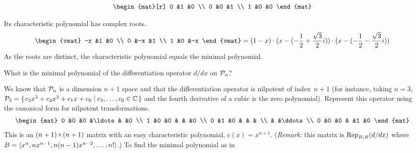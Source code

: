 \begin{exercises}
\begin{equation*}
\begin{mat}[r]
           0  &1  &0  \\
           0  &0  &1  \\
           1  &0  &0
        \end{mat}
     \end{equation*}
     \begin{answer}
       Its characteristic polynomial has complex roots.
       \begin{equation*}
          \begin{vmat}
                   -x  &1  &0  \\
                    0  &-x &1  \\
                    1  &0  &-x
          \end{vmat}
          =(1-x)\cdot (x-(-\frac{1}{2}+\frac{\sqrt{3}}{2}i))
                \cdot (x-(-\frac{1}{2}-\frac{\sqrt{3}}{2}i))
       \end{equation*}
       As the roots are distinct, the characteristic polynomial equals the
       minimal polynomial. 
     \end{answer}
  \recommended \item 
     What is the minimal polynomial of the differentiation
     operator $d/dx$ on \( \polyspace_n \)?
     \begin{answer}
       We know that $\polyspace_n$ is a dimension $n+1$ space and that
       the differentiation operator is
       nilpotent of index~$n+1$ (for instance, taking $n=3$, 
       $\polyspace_3=\set{c_3x^3+c_2x^2+c_1x+c_0\suchthat c_3,\ldots,c_0\in\C}$
       and the fourth derivative of a cubic is the zero polynomial).  
       Represent this operator using the canonical 
       form for nilpotent transformations.
       \begin{equation*}
         \begin{mat}
           0  &0  &0  &\ldots &  &0  \\
           1  &0  &0  &       &  &0  \\
           0  &1  &0  &       &  &   \\
              &   &\ddots            \\
           0  &0  &0  &       &1 &0 
         \end{mat}
       \end{equation*}
       This is an $\nbyn{(n+1)}$ matrix with an easy 
       characteristic polynomial,
       $c(x)=x^{n+1}$.
       (\textit{Remark:} this matrix is $\rep{d/dx}{B,B}$ where
        $B=\sequence{x^n,nx^{n-1},n(n-1)x^{n-2},\ldots,n!}$.)
       To find the minimal polynomial as in 

\end{answer}
\end{exercises}

